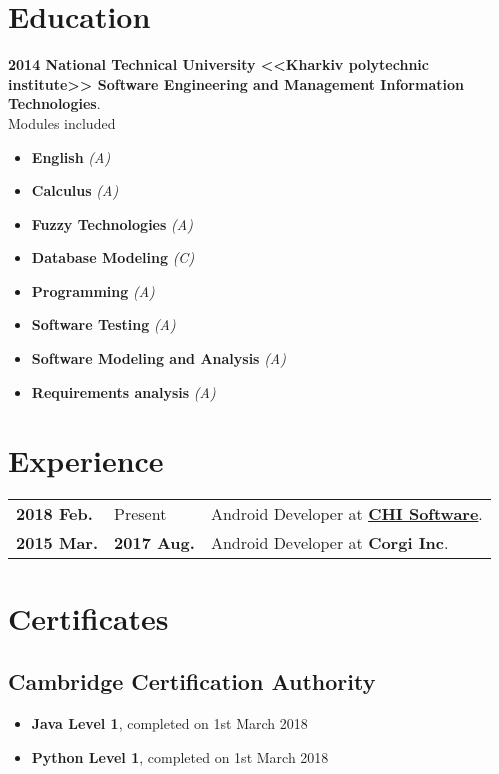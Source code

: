 \documentclass[a4paper]{article}
\begin{document}
	\section*{Education}
	\textbf{2014 National Technical University <<Kharkiv polytechnic institute>> Software Engineering and Management Information Technologies}. \\
	Modules included 
	\begin{multicols}{2}
	\begin{itemize}
		\item \textbf{English} \textit{(A)}
		\item \textbf{Calculus} \textit{(A)}
		\item \textbf{Fuzzy Technologies} \textit{(A)}
		\item \textbf{Database Modeling} \textit{(C)}
		\item \textbf{Programming} \textit{(A)}
		\item \textbf{Software Testing} \textit{(A)}
		\item \textbf{Software Modeling and Analysis} \textit{(A)}
		\item \textbf{Requirements analysis} \textit{(A)}
	\end{itemize}
	\end{multicols}

	\section*{Experience}
	\begin{tabular}{@{}l@{\enspace--\enspace}ll}
		\textbf{2018 Feb.} & Present & Android Developer at \href{https://chisw.com}{\textbf{CHI Software}}. \\
		\textbf{2015 Mar.} & \textbf{2017 Aug.} & Android Developer at \textbf{Corgi Inc}. \\
	\end{tabular}
	
	\section*{Certificates}
	\subsection*{Cambridge Certification Authority}
	\begin{itemize}
		\item \textbf{Java Level 1}, completed on 1st March 2018
		\item \textbf{Python Level 1}, completed on 1st March 2018
	\end{itemize}
\end{document}

